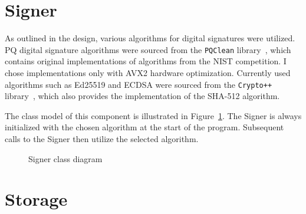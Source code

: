 
\section{Signer}

As outlined in the design, various algorithms for digital signatures were utilized. PQ digital signature algorithms were sourced from the \texttt{PQClean} library~\cite{PQClean.git, PQClean.article}, which contains original implementations of algorithms from the NIST competition. I chose implementations only with AVX2 hardware optimization. Currently used algorithms such as Ed25519 and ECDSA were sourced from the \texttt{Crypto++} library~\cite{Crypto++.lib.web}, which also provides the implementation of the SHA-512 algorithm.

The class model of this component is illustrated in Figure~\ref{figure:my.signer.diagram}. The Signer is always initialized with the chosen algorithm at the start of the program. Subsequent calls to the Signer then utilize the selected algorithm.

\begin{figure}[h]
    \begin{center}
    \end{center}
    \caption{Signer class diagram}
    \label{figure:my.signer.diagram}
\end{figure}


\section{Storage}

